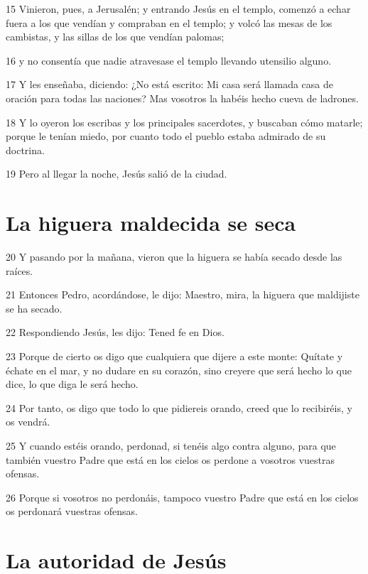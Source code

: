 \par 15 Vinieron, pues, a Jerusalén; y entrando Jesús en el templo, comenzó a echar fuera a los que vendían y compraban en el templo; y volcó las mesas de los cambistas, y las sillas de los que vendían palomas;
\par 16 y no consentía que nadie atravesase el templo llevando utensilio alguno.
\par 17 Y les enseñaba, diciendo: ¿No está escrito: Mi casa será llamada casa de oración para todas las naciones? Mas vosotros la habéis hecho cueva de ladrones.
\par 18 Y lo oyeron los escribas y los principales sacerdotes, y buscaban cómo matarle; porque le tenían miedo, por cuanto todo el pueblo estaba admirado de su doctrina.
\par 19 Pero al llegar la noche, Jesús salió de la ciudad.

\section*{La higuera maldecida se seca}

\par 20 Y pasando por la mañana, vieron que la higuera se había secado desde las raíces.
\par 21 Entonces Pedro, acordándose, le dijo: Maestro, mira, la higuera que maldijiste se ha secado.
\par 22 Respondiendo Jesús, les dijo: Tened fe en Dios.
\par 23 Porque de cierto os digo que cualquiera que dijere a este monte: Quítate y échate en el mar, y no dudare en su corazón, sino creyere que será hecho lo que dice, lo que diga le será hecho.
\par 24 Por tanto, os digo que todo lo que pidiereis orando, creed que lo recibiréis, y os vendrá.
\par 25 Y cuando estéis orando, perdonad, si tenéis algo contra alguno, para que también vuestro Padre que está en los cielos os perdone a vosotros vuestras ofensas.
\par 26 Porque si vosotros no perdonáis, tampoco vuestro Padre que está en los cielos os perdonará vuestras ofensas.

\section*{La autoridad de Jesús}

